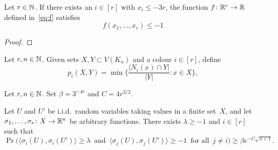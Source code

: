 \begin{lemma}
    \label{lem:special-function-ec}
    Let $r \in \mathbb{N}$. If there exists an $i \in [r]$ with $x_i \le - 3r$, the function $f \colon \mathbb{R}^r \rightarrow \mathbb{R}$ defined in~\eqref{eq:f} satisfies
    $$
    f(x_1,\dots,x_r) \le -1$$
    \end{lemma}
    \begin{proof}
    \end{proof}


  \begin{definition}
    \label{def:p}
    Let $r, n\in\mathbb{N}$. Given sets $X,Y \subset V(K_n)$ and a colour $i \in [r]$, define
    $$p_i(X,Y) = \min\bigg\{ \frac{|N_i(x) \cap Y|}{|Y|} : x \in X \bigg\},$$
  \end{definition}

  \begin{lemma}
    \label{lem:geometric}
    Let $r, n\in\mathbb{N}$. Set $\beta = 3^{-4r}$ and $C = 4r^{3/2}$.

    Let\/ $U$ and\/ $U'$ be i.i.d.~random variables taking values in a finite set~$X$, and let $\sigma_1,\ldots,\sigma_r \colon X \rightarrow \mathbb{R}^n$ be arbitrary functions. There exists $\lambda\ge-1$ and\/ $i\in[r]$ such that
    $$\Pr\Big( \big\langle \sigma_i(U),\sigma_i(U') \big\rangle \ge \lambda \, \text{ and } \, \big\langle \sigma_j(U), \sigma_j(U') \big\rangle \ge -1 \, \text{ for all } \, j \ne i \Big) \ge \beta e^{- C\sqrt{\lambda + 1}}.$$
  \end{lemma}

